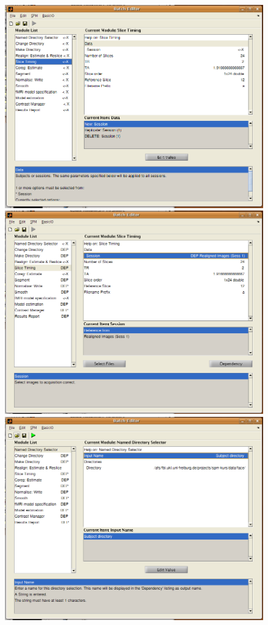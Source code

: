 \begin{figure}[htbp]
  \centering
  \includegraphics[height=.3\textheight]{batch/batch_single_subject_template_nodeps}

  \includegraphics[height=.3\textheight]{batch/batch_single_subject_template}

  \includegraphics[height=.3\textheight]{batch/batch_single_subject}


\end{figure}
